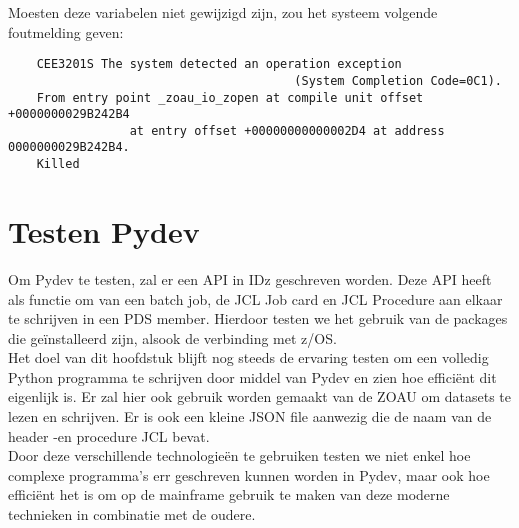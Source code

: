 Moesten deze variabelen niet gewijzigd zijn, zou het systeem volgende foutmelding geven:
\begin{lstlisting}
    CEE3201S The system detected an operation exception 
                                        (System Completion Code=0C1).
    From entry point _zoau_io_zopen at compile unit offset +0000000029B242B4 
                 at entry offset +00000000000002D4 at address 0000000029B242B4.
    Killed
\end{lstlisting}

\chapter{Testen Pydev}
\label{ch:test-pydev}

Om Pydev te testen, zal er een API in IDz geschreven worden. Deze API heeft als functie om van een batch job, de JCL Job card en JCL Procedure aan elkaar te schrijven in een PDS member. Hierdoor testen we het gebruik van de packages die geïnstalleerd zijn, alsook de verbinding met z/OS. \\

Het doel van dit hoofdstuk blijft nog steeds de ervaring testen om een volledig Python programma te schrijven door middel van Pydev en zien hoe efficiënt dit eigenlijk is. Er zal hier ook gebruik worden gemaakt van de ZOAU om datasets te lezen en schrijven. Er is ook een kleine JSON file aanwezig die de naam van de header -en procedure JCL bevat. \\

Door deze verschillende technologieën te gebruiken testen we niet enkel hoe complexe programma's err geschreven kunnen worden in Pydev, maar ook hoe efficiënt het is om op de mainframe gebruik te maken van deze moderne technieken in combinatie met de oudere.

